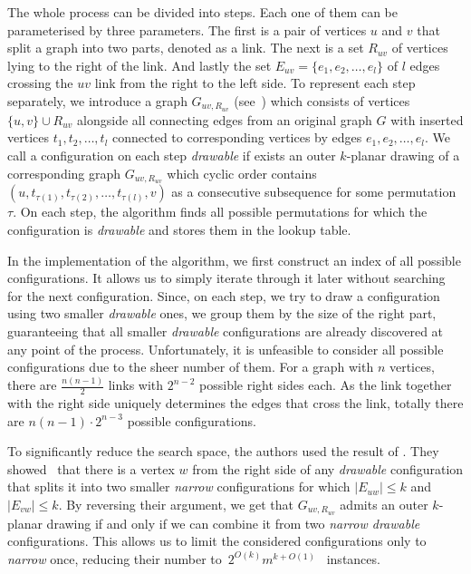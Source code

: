 The whole process can be divided into steps. Each one of them can be parameterised by three parameters. The first is a pair of vertices \(u\) and \(v\) that split a graph into two parts, denoted as a link. The next is a set \(R_{uv}\) of vertices lying to the right of the link. And lastly the set \(E_{uv} = \{e_1, e_2, \dots, e_l\}\) of \(l\) edges crossing the \(uv\) link from the right to the left side. To represent each step separately, we introduce a graph \(G_{uv, R_{uv}}\) (see~) which consists of vertices \(\{u, v\} \cup R_{uv}\) alongside all connecting edges from an original graph \(G\) with inserted vertices \(t_1, t_2, \dots, t_l\) connected to corresponding vertices by edges \(e_1, e_2, \dots, e_l\). We call a configuration on each step \emph{drawable} if exists an outer \(k\)-planar drawing of a corresponding graph \(G_{uv, R_{uv}}\) which cyclic order contains \((u, t_{\tau(1)}, t_{\tau(2)}, \dots, t_{\tau(l)}, v)\) as a consecutive subsequence for some permutation \(\tau\). On each step, the algorithm finds all possible permutations for which the configuration is \emph{drawable} and stores them in the lookup table.

In the implementation of the algorithm, we first construct an index of all possible configurations. It allows us to simply iterate through it later without searching for the next configuration. Since, on each step, we try to draw a configuration using two smaller \emph{drawable} ones, we group them by the size of the right part, guaranteeing that all smaller \emph{drawable} configurations are already discovered at any point of the process. Unfortunately, it is unfeasible to consider all possible configurations due to the sheer number of them. For a graph with \(n\) vertices, there are \(\frac{n(n-1)}{2}\) links with \(2^{n-2}\) possible right sides each. As the link together with the right side uniquely determines the edges that cross the link, totally there are \(n(n-1)\cdot2^{n-3}\) possible configurations.

To significantly reduce the search space, the authors used the result of \citeauthor{triangulations}. They showed~\cite{triangulations} that there is a vertex \(w\) from the right side of any \emph{drawable} configuration that splits it into two smaller \emph{narrow} configurations for which \(|E_{uw}| \leqslant k\) and \(|E_{vw}| \leqslant k\). By reversing their argument, we get that \(G_{uv, R_{uv}}\) admits an outer \(k\)-planar drawing if and only if we can combine it from two \emph{narrow drawable} configurations. This allows us to limit the considered configurations only to \emph{narrow} once, reducing their number to~\(2^{O(k)}m^{k+O(1)}\)~\cite[Lemma 15]{okp} instances.

